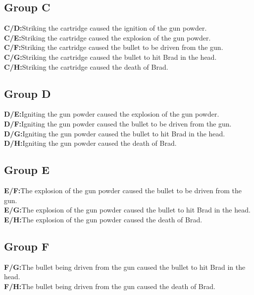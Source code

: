 \documentclass[12pt]{scrartcl}
\begin{document}
\subsection*{Group C}
\noindent\textbf{\textsf{C/D:}}\tab Striking the cartridge caused the ignition of the gun powder.\\
\noindent\textbf{\textsf{C/E:}}\tab Striking the cartridge caused the explosion of the gun powder.\\
\noindent\textbf{\textsf{C/F:}}\tab Striking the cartridge caused the bullet to be driven from the gun.\\
\noindent\textbf{\textsf{C/G:}}\tab Striking the cartridge caused the bullet to hit Brad in the head.\\
\noindent\textbf{\textsf{C/H:}}\tab Striking the cartridge caused the death of Brad.

\subsection*{Group D}
\noindent\textbf{\textsf{D/E:}}\tab Igniting the gun powder caused the explosion of the gun powder.\\
\noindent\textbf{\textsf{D/F:}}\tab Igniting the gun powder caused the bullet to be driven from the gun.\\
\noindent\textbf{\textsf{D/G:}}\tab Igniting the gun powder caused the bullet to hit Brad in the head.\\
\noindent\textbf{\textsf{D/H:}}\tab Igniting the gun powder caused the death of Brad.

\subsection*{Group E}
\noindent\textbf{\textsf{E/F:}}\tab The explosion of the gun powder caused the bullet to be driven from the gun.\\
\noindent\textbf{\textsf{E/G:}}\tab The explosion of the gun powder caused the bullet to hit Brad in the head.\\
\noindent\textbf{\textsf{E/H:}}\tab The explosion of the gun powder caused the death of Brad.

\subsection*{Group F}
\noindent\textbf{\textsf{F/G:}}\tab The bullet being driven from the gun caused the bullet to hit Brad in the head.\\
\noindent\textbf{\textsf{F/H:}}\tab The bullet being driven from the gun caused the death of Brad.
\end{document}
